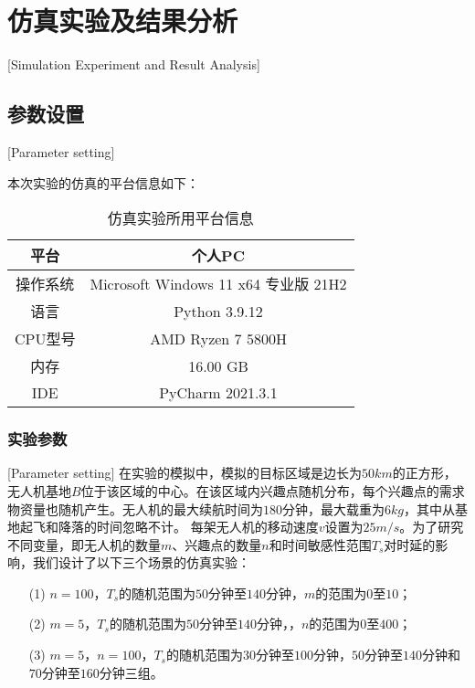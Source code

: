 
\chapter{仿真实验及结果分析}[Simulation Experiment and Result Analysis]

\section{参数设置}[Parameter setting]

本次实验的仿真的平台信息如下：

\begin{table}[h]
\begin{center}
\caption{仿真实验所用平台信息} 
\begin{tabular}{c||c}
\hline
平台 & 个人PC \\
\hline
操作系统 & Microsoft Windows 11 x64 专业版 21H2 \\
\hline
语言 & Python 3.9.12 \\
\hline
CPU型号 & AMD Ryzen 7 5800H \\
\hline
内存 & 16.00 GB \\
\hline
IDE & PyCharm 2021.3.1  \\ 
\hline
\end{tabular}
\end{center}
\end{table}

\subsection{实验参数}[Parameter setting]
在实验的模拟中，模拟的目标区域是边长为$50km$的正方形，无人机基地$B$位于该区域的中心。在该区域内兴趣点随机分布，每个兴趣点的需求物资量也随机产生。无人机的最大续航时间为$180$分钟，最大载重为$6kg$，其中从基地起飞和降落的时间忽略不计。
每架无人机的移动速度$v$设置为$25m/s$。为了研究不同变量，即无人机的数量$m$、兴趣点的数量$n$和时间敏感性范围$T_s$对时延的影响，我们设计了以下三个场景的仿真实验：
\begin{itemize}
	\item [(1)] $n = 100$，$T_s$的随机范围为$50$分钟至$140$分钟，$m$的范围为$0$至$10$；
	\item [(2)] $m = 5$，$T_s$的随机范围为$50$分钟至$140$分钟，，$n$的范围为$0$至$400$；
 	\item [(3)] $m = 5$，$n = 100$，$T_s$的随机范围为$30$分钟至$100$分钟，$50$分钟至$140$分钟和
$70$分钟至$160$分钟三组。
\end{itemize}
